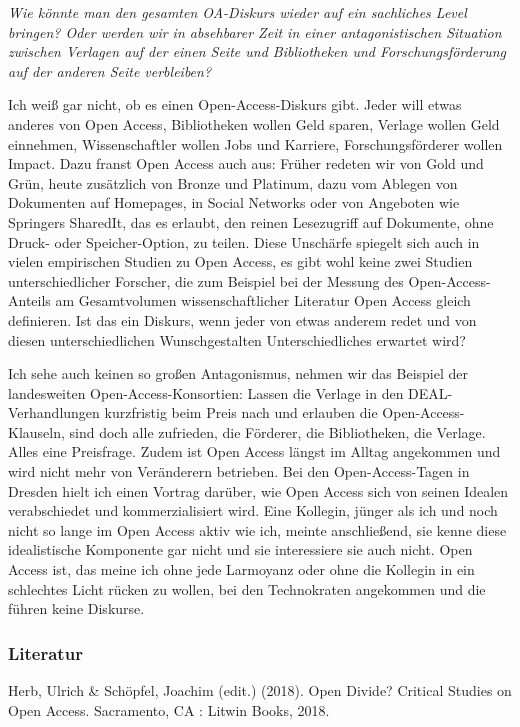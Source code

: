 \documentclass[a4paper,
fontsize=11pt,
oneside,
numbers=noperiodatend,
parskip=half-,
bibliography=totoc,
final
]{scrartcl}
\begin{document}
\emph{Wie könnte man den gesamten OA-Diskurs wieder auf ein sachliches
Level bringen? Oder werden wir in absehbarer Zeit in einer
antagonistischen Situation zwischen Verlagen auf der einen Seite und
Bibliotheken und Forschungsförderung auf der anderen Seite verbleiben?}

Ich weiß gar nicht, ob es einen Open-Access-Diskurs gibt. Jeder will
etwas anderes von Open Access, Bibliotheken wollen Geld sparen, Verlage
wollen Geld einnehmen, Wissenschaftler wollen Jobs und Karriere,
Forschungsförderer wollen Impact. Dazu franst Open Access auch aus:
Früher redeten wir von Gold und Grün, heute zusätzlich von Bronze und
Platinum, dazu vom Ablegen von Dokumenten auf Homepages, in Social
Networks oder von Angeboten wie Springers SharedIt, das es erlaubt, den
reinen Lesezugriff auf Dokumente, ohne Druck- oder Speicher-Option, zu
teilen. Diese Unschärfe spiegelt sich auch in vielen empirischen Studien
zu Open Access, es gibt wohl keine zwei Studien unterschiedlicher
Forscher, die zum Beispiel bei der Messung des Open-Access-Anteils am
Gesamtvolumen wissenschaftlicher Literatur Open Access gleich
definieren. Ist das ein Diskurs, wenn jeder von etwas anderem redet und
von diesen unterschiedlichen Wunschgestalten Unterschiedliches erwartet
wird?

Ich sehe auch keinen so großen Antagonismus, nehmen wir das Beispiel der
landesweiten Open-Access-Konsortien: Lassen die Verlage in den
DEAL-Verhandlungen kurzfristig beim Preis nach und erlauben die
Open-Access-Klauseln, sind doch alle zufrieden, die Förderer, die
Bibliotheken, die Verlage. Alles eine Preisfrage. Zudem ist Open Access
längst im Alltag angekommen und wird nicht mehr von Veränderern
betrieben. Bei den Open-Access-Tagen in Dresden hielt ich einen Vortrag
darüber, wie Open Access sich von seinen Idealen verabschiedet und
kommerzialisiert wird. Eine Kollegin, jünger als ich und noch nicht so
lange im Open Access aktiv wie ich, meinte anschließend, sie kenne diese
idealistische Komponente gar nicht und sie interessiere sie auch nicht.
Open Access ist, das meine ich ohne jede Larmoyanz oder ohne die
Kollegin in ein schlechtes Licht rücken zu wollen, bei den Technokraten
angekommen und die führen keine Diskurse.

\subsubsection{Literatur}\label{literatur}

Herb, Ulrich \& Schöpfel, Joachim (edit.) (2018). Open Divide? Critical
Studies on Open Access. Sacramento, CA : Litwin Books, 2018.
\end{document}
